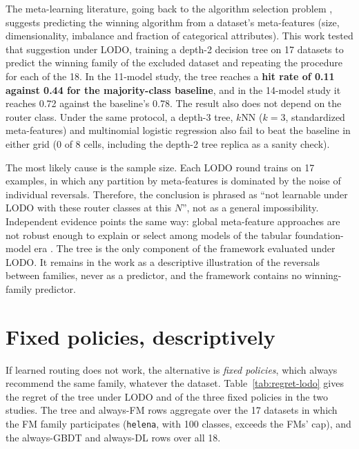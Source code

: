 The meta-learning literature, going back to the algorithm selection problem \citep{rice1976}, suggests predicting the winning algorithm from a dataset's meta-features (size, dimensionality, imbalance and fraction of categorical attributes). This work tested that suggestion under LODO, training a depth-2 decision tree on 17 datasets to predict the winning family of the excluded dataset and repeating the procedure for each of the 18. In the
11-model study, the tree reaches a \textbf{hit rate of 0.11 against
0.44 for the majority-class baseline}, and in the 14-model study it reaches 0.72 against the baseline's 0.78. The result also does not
depend on the router class. Under the same protocol, a depth-3 tree, $k$NN ($k{=}3$, standardized meta-features) and multinomial logistic regression also fail to beat the baseline in either grid (0 of 8 cells, including the depth-2 tree replica as a sanity check).

The most likely cause is the sample size. Each LODO round trains on
17 examples, in which any partition by meta-features
is dominated by the noise of individual reversals. Therefore, the conclusion is phrased as ``not learnable under LODO with these router
classes at this $N$'', not as a general impossibility. Independent evidence points the same way: global meta-feature approaches
are not robust enough to explain or select among models of the
tabular foundation-model era \citep{herre2026}. The tree is the only
component of the framework evaluated under LODO. It remains in the work as a descriptive illustration of the reversals between families, never as a predictor, and the framework contains no winning-family predictor.

\section{Fixed policies, descriptively}
\label{sec:resultado-positivo}

If learned routing does not work, the alternative is \emph{fixed policies}, which always recommend the same family,
whatever the dataset. Table~\ref{tab:regret-lodo} gives the regret of
the tree under LODO and of the three fixed policies in the two
studies. The tree and always-FM rows aggregate over the 17 datasets
in which the FM family participates (\texttt{helena}, with 100 classes, exceeds the FMs' cap), and the always-GBDT and always-DL rows over all 18.


